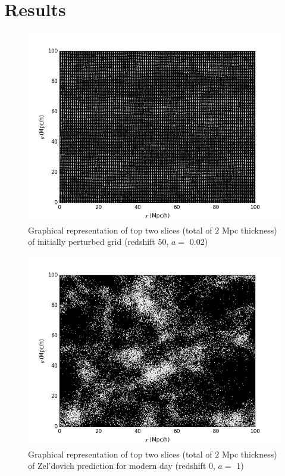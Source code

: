 \documentclass[12pt]{article}   	%
\begin{document}
\section*{Results}
\begin{figure}[h!]
\centering
\includegraphics[scale=0.85]{init100.png}
\caption{Graphical representation of top two slices (total of 2 Mpc thickness) of initially perturbed grid
(redshift 50, $a =$ 0.02)}
\end{figure}
\begin{figure}[h!]
\centering
\includegraphics[scale=0.85]{Zeldovich100.png}
\caption{Graphical representation of top two slices (total of 2 Mpc thickness) of Zel'dovich
prediction for modern day (redshift 0, $a =$ 1)}
\end{figure}
\end{document}
